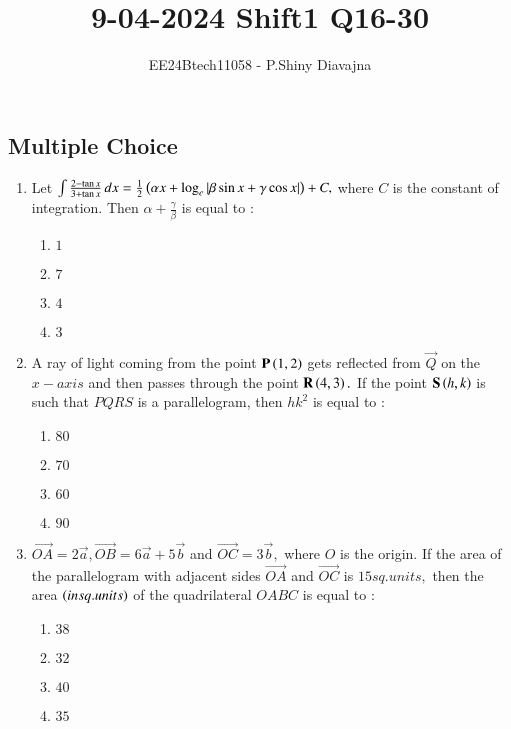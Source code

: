 \documentclass[journal,12pt,onecolumn]{IEEEtran}
\theoremstyle{remark}
\begin{document}
\title{9-04-2024 Shift1 Q16-30}
\author{EE24Btech11058 - P.Shiny Diavajna}
\maketitle
\renewcommand{\thefigure}{\theenumi}
\renewcommand{\thetable}{\theenumi}
\subsection{Multiple Choice}
\begin{enumerate}
    \item Let $\int \frac{2 - \tan x}{3+ \tan x} \,dx = \frac{1}{2}\left(\alpha x + \log_e |\beta \sin x + \gamma \cos x |\right) + C,$ where $C$ is the constant of integration. Then $\alpha + \frac{\gamma}{\beta}$ is equal to :
    \begin{enumerate}
        \item $1$
        \item $7$
        \item $4$
        \item $3$\\
    \end{enumerate}


    \item A ray of light coming from the point $\mathbf{P}\left(1,2\right)$ gets reflected from $\vec{Q}$ on the $x-axis$ and then passes through the point $\mathbf{R}\left(4,3\right).$ If the point $\mathbf{S}\left(h,k\right)$ is such that $PQRS$ is a parallelogram, then $hk^2$ is equal to :
    \begin{enumerate}
        \item $80$
        \item $70$
        \item $60$
        \item $90$\\
    \end{enumerate}

    \item $\overrightarrow{OA} = 2 \overrightarrow{a},\overrightarrow{OB} = 6\overrightarrow{a}+ 5\overrightarrow{b}$ and $\overrightarrow{OC} = 3\overrightarrow{b},$ where $O$ is the origin. If the area of the parallelogram with adjacent sides $\overrightarrow{OA}$ and $\overrightarrow{OC}$ is $15sq.units,$ then the area $\left(in sq.units\right)$ of the quadrilateral $OABC$ is equal to :
    \begin{enumerate}
        \item $38$
        \item $32$
        \item $40$
        \item $35$\\
    \end{enumerate}


\end{enumerate}
\end{document}
